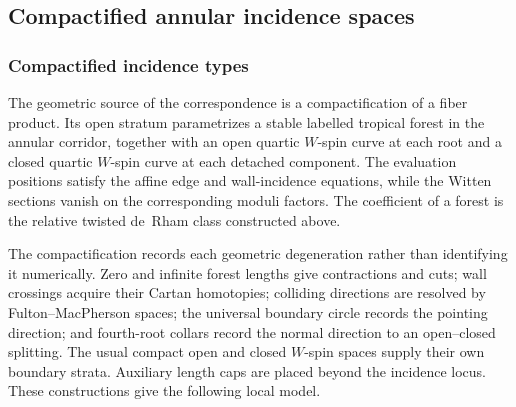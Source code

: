 \subsection{Compactified annular incidence spaces}

\subsubsection{Compactified incidence types}

The geometric source of the correspondence is a compactification of a
fiber product.  Its open stratum parametrizes a stable labelled tropical
forest in the annular corridor, together with an open quartic $W$-spin curve
at each root and a closed quartic $W$-spin curve at each detached component.
The evaluation positions satisfy the affine edge and wall-incidence
equations, while the Witten sections vanish on the corresponding moduli
factors.  The coefficient of a forest is the relative twisted de~Rham class
constructed above.

The compactification records each geometric degeneration rather than
identifying it numerically.  Zero and infinite forest lengths give
contractions and cuts; wall crossings acquire their Cartan homotopies;
colliding directions are resolved by Fulton--MacPherson spaces; the universal
boundary circle records the pointing direction; and fourth-root collars
record the normal direction to an open--closed splitting.  The usual compact
open and closed $W$-spin spaces supply their own boundary strata.  Auxiliary
length caps are placed beyond the incidence locus.  These constructions give
the following local model.

